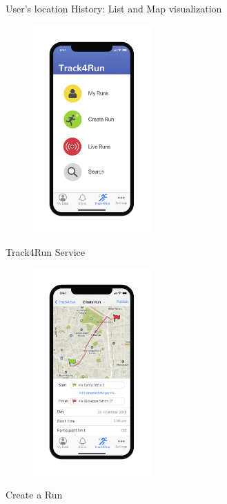 \hspace*{1,5cm}User's location History: List and Map visualization



\begin{figure}[H]
    \centering
    \includegraphics[width=0.4\textwidth]{rasdL/Pictures/Mockup/mobile/track4run.png}

\end{figure}
\hspace*{5.6cm}Track4Run Service

\begin{figure}[H]
    \centering
    \includegraphics[width=0.4\textwidth]{rasdL/Pictures/Mockup/mobile/create_run.png}

\end{figure}
\hspace*{5.7cm}Create a Run


